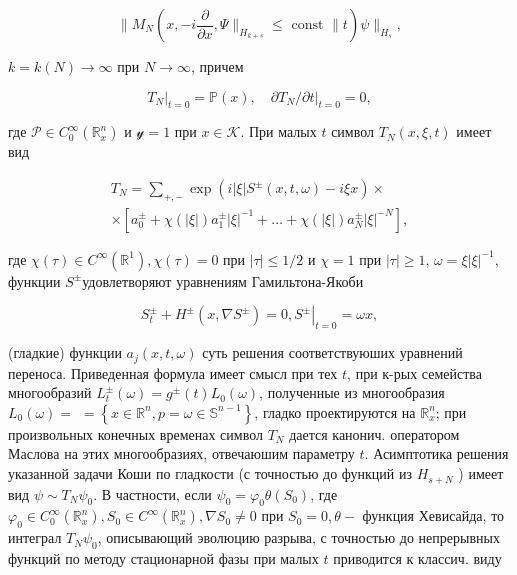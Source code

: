 \documentclass[10pt]{article}
\begin{document}
\[

\| M_{N}\left(x,-i \frac{\partial}{\partial x}, \Psi \|_{H_{k+s}} \leqslant \text { const } \| t\right) \psi \|_{H_{s}},

\]



$k=k(N) \rightarrow \infty$ при $N \rightarrow \infty$, причем



\[

\left.T_{N}\right|_{t=0}=\mathbb{P}(x), \quad \partial T_{N} /\left.\partial t\right|_{t=0}=0,

\]



где $\mathscr{P} \in C_{0}^{\infty}\left(\mathbb{R}_{x}^{n}\right)$ и $\mathscr{y}=1$ при $x \in \mathscr{K}$. При малых $t$ символ $T_{N}(x, \xi, t)$ имеет вид



\[

\begin{gathered}

T_{N}=\sum_{+,-} \exp \left(i|\xi| S^{ \pm}(x, t, \omega)-i \xi x\right) \times \\

\times\left[a_{0}^{ \pm}+\chi(|\xi|) a_{1}^{ \pm}|\xi|^{-1}+\ldots+\chi(|\xi|) a_{N}^{ \pm}|\xi|^{-N}\right],

\end{gathered}

\]



где $\chi(\tau) \in C^{\infty}\left(\mathbb{R}^{1}\right), \chi(\tau)=0$ при $|\tau| \leqslant 1 / 2$ и $\chi=1$ при $|\tau| \geqslant 1$, $\omega=\xi|\xi|^{-1}$, функции $S^{ \pm}$удовлетворяют уравнениям Гамильтона-Якоби



\[

S_{t}^{ \pm}+H^{ \pm}\left(x, \nabla S^{ \pm}\right)=0,\left.S^{ \pm}\right|_{t=0}=\omega x,

\]



(гладкие) функции $a_{j}(x, t, \omega)$ суть решения соответствуюших уравнений переноса. Приведенная формула имеет смысл при тех $t$, при к-рых семейства многообразий $L_{t}^{ \pm}(\omega)=g^{ \pm}(t) L_{0}(\omega)$, полученные из многообразия $L_{0}(\omega)=$ $=\left\{x \in \mathbb{R}^{n}, p=\omega \in \mathbb{S}^{n-1}\right\}$, гладко проектируются на $\mathbb{R}_{x}^{n}$; при произвольных конечных временах символ $T_{N}$ дается канонич. оператором Маслова на этих многообразиях, отвечаюшим параметру $t$. Асимптотика решения указанной задачи Коши по гладкости (с точностью до функций из $H_{s+N}$ ) имеет вид $\psi \sim T_{N} \psi_{0}$. В частности, если $\psi_{0}=\varphi_{0} \theta\left(S_{0}\right)$, где $\varphi_{0} \in C_{0}^{\infty}\left(\mathbb{R}_{x}^{n}\right), S_{0} \in C^{\infty}\left(\mathbb{R}_{x}^{n}\right), \nabla S_{0} \neq 0$ при $S_{0}=0, \theta-$ функция Хевисайда, то интеграл $T_{N} \psi_{0}$, описывающий эволюцию разрыва, с точностью до непрерывных функций по методу стационарной фазы при малых $t$ приводится к классич. виду
\end{document}
